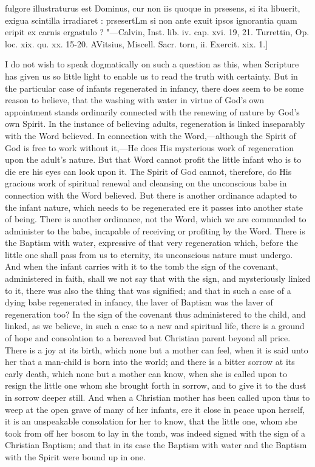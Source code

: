 \documentclass[]{book}
\begin{document}
{fulgore illustraturus est Dominus, cur non iis quoque in prsesens, si ita libuerit, exigua scintilla irradiaret : prsesertLm si non ante exuit ipsos ignorantia quam eripit ex carnis ergastulo ? "---Calvin, Inst. lib. iv. cap. xvi. 19, 21. Turrettin, Op. loc. xix. qu. xx. 15-20. AVitsius, Miscell. Sacr. torn, ii. Exercit. xix. 1.{]}}

I do not wish to speak dogmatically on such a question as this, when Scripture has given us so little light to enable us to read the truth with certainty. But in the particular case of infants regenerated in infancy, there does seem to be some reason to believe, that the washing with water in virtue of God's own appointment stands ordinarily connected with the renewing of nature by God's own Spirit. In the instance of believing adults, regeneration is linked inseparably with the Word believed. In connection with the Word,---although the Spirit of God is free to work without it,---He does His mysterious work of regeneration upon the adult's nature. But that Word cannot profit the little infant who is to die ere his eyes can look upon it. The Spirit of God cannot, therefore, do His gracious work of spiritual renewal and cleansing on the unconscious babe in connection with the Word believed. But there is another ordinance adapted to the infant nature, which needs to be regenerated ere it passes into another state of being. There is another ordinance, not the Word, which we are commanded to administer to the babe, incapable of receiving or profiting by the Word. There is the Baptism with water, expressive of that very regeneration which, before the little one shall pass from us to eternity, its unconscious nature must undergo. And when the infant carries with it to the tomb the sign of the covenant, administered in faith, shall we not say that with the sign, and mysteriously linked to it, there was also the thing that was signified; and that in such a case of a dying babe regenerated in infancy, the laver of Baptism was the laver of regeneration too? In the sign of the covenant thus administered to the child, and linked, as we believe, in such a case to a new and spiritual life, there is a ground of hope and consolation to a bereaved but Christian parent beyond all price. There is a joy at its birth, which none but a mother can feel, when it is said unto her that a man-child is born into the world; and there is a bitter sorrow at its early death, which none but a mother can know, when she is called upon to resign the little one whom she brought forth in sorrow, and to give it to the dust in sorrow deeper still. And when a Christian mother has been called upon thus to weep at the open grave of many of her infants, ere it close in peace upon herself, it is an unspeakable consolation for her to know, that the little one, whom she took from off her bosom to lay in the tomb, was indeed signed with the sign of a Christian Baptism; and that in its case the Baptism with water and the Baptism with the Spirit were bound up in one.
\end{document}
